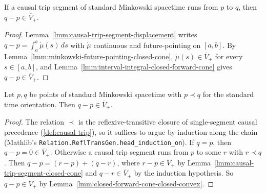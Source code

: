 \begin{lemma}
    \label{lmm:causal-trip-segment-closed-cone}
    \leanok
    If a causal trip segment of standard Minkowski spacetime runs from $p$ to $q$, then $q - p \in \overline{V}_+$.
\end{lemma}
\begin{proof}
    \leanok
    Lemma~\ref{lmm:causal-trip-segment-displacement} writes $q - p = \int_a^b \dot\mu(s)\,ds$ with $\dot\mu$ continuous and future-pointing on $[a,b]$. By Lemma~\ref{lmm:minkowski-future-pointing-closed-cone}, $\dot\mu(s) \in \overline{V}_+$ for every $s \in [a,b]$, and Lemma~\ref{lmm:interval-integral-closed-forward-cone} gives $q - p \in \overline{V}_+$.
\end{proof}

\begin{lemma}
    \label{lmm:causal-precedence-closed-forward-cone}
    \leanok
    Let $p, q$ be points of standard Minkowski spacetime with $p \prec q$ for the standard time orientation. Then $q - p \in \overline{V}_+$.
\end{lemma}
\begin{proof}
    \leanok
    The relation $\prec$ is the reflexive-transitive closure of single-segment causal precedence (\ref{def:causal-trip}), so it suffices to argue by induction along the chain (Mathlib's \texttt{Relation.ReflTransGen.head\_induction\_on}). If $q = p$, then $q - p = 0 \in \overline{V}_+$. Otherwise a causal trip segment runs from $p$ to some $r$ with $r \prec q$. Then $q - p = (r - p) + (q - r)$, where $r - p \in \overline{V}_+$ by Lemma~\ref{lmm:causal-trip-segment-closed-cone} and $q - r \in \overline{V}_+$ by the induction hypothesis. So $q - p \in \overline{V}_+$ by Lemma~\ref{lmm:closed-forward-cone-closed-convex}.
\end{proof}

